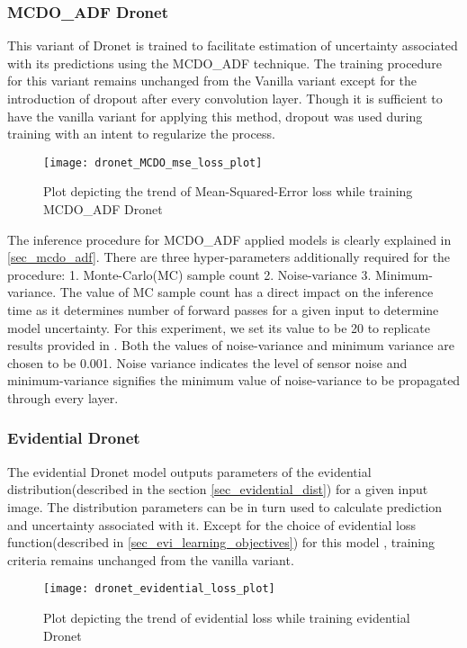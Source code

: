\subsubsection{MCDO\_ADF Dronet}
This variant of Dronet is trained to facilitate estimation of uncertainty associated with its predictions using the MCDO\_ADF technique. The training procedure for this variant remains unchanged from the Vanilla variant except for the  introduction of dropout after every convolution layer. Though it is sufficient to have the vanilla variant for applying this method, dropout was used during training with an intent to regularize the process.
\begin{figure}[H]
	\centering
	\texttt{[image: dronet\_MCDO\_mse\_loss\_plot]}
	\caption{Plot depicting the trend of Mean-Squared-Error loss while training MCDO\_ADF Dronet}
	\label{fig_mse_loss_mcdo_dronet}
\end{figure}

The inference procedure for MCDO\_ADF applied models is clearly explained in \ref{sec_mcdo_adf}. There are three hyper-parameters additionally required for the procedure: 1. Monte-Carlo(MC) sample count 2. Noise-variance 3. Minimum-variance. The value of MC sample count has a direct impact on the inference time as it determines number of forward passes for a given input to determine model uncertainty. For this experiment, we set its value to be 20 to replicate results provided in \cite{loquercio2020a}. Both the values of noise-variance and minimum variance are chosen to be 0.001. Noise variance indicates the level of sensor noise and minimum-variance signifies the minimum value of noise-variance to be propagated through every layer.

\subsubsection{Evidential Dronet}
The evidential Dronet model outputs parameters of the evidential distribution(described in the section \ref{sec_evidential_dist}) for a given input image. The distribution parameters can be in turn used to calculate prediction and uncertainty associated with it. Except for the choice of evidential loss function(described in \ref{sec_evi_learning_objectives}) for this model , training criteria remains unchanged from the vanilla variant.
\begin{figure}[H]
	\centering
	\texttt{[image: dronet\_evidential\_loss\_plot]}
	\caption{Plot depicting the trend of evidential loss while training evidential Dronet}
	\label{fig_mse_loss_mcdo_dronet}
\end{figure}
